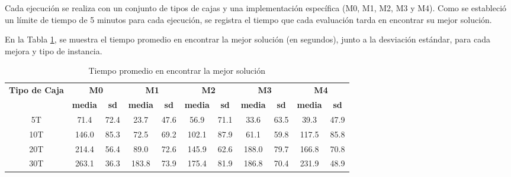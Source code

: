 Cada ejecución se realiza con un conjunto de tipos de cajas y una implementación específica (M0, M1, M2, M3 y M4). Como se estableció un límite de tiempo de 5 minutos para cada ejecución, se registra el tiempo que cada evaluación tarda en encontrar su mejor solución.

En la Tabla \ref{tab:tiempo}, se muestra el tiempo promedio en encontrar la mejor solución (en segundos), junto a la desviación estándar, para cada mejora y tipo de instancia.

\begin{table}[H]
    \centering
    \caption{Tiempo promedio en encontrar la mejor solución}
    \label{tab:tiempo}
    \begin{tabular}{|c|c|c|c|c|c|c|c|c|c|c|}
        \hline
        \multirow{2}{*}{\textbf{Tipo de Caja}} & \multicolumn{2}{c|}{\textbf{M0}} & \multicolumn{2}{c|}{\textbf{M1}} & \multicolumn{2}{c|}{\textbf{M2}} & \multicolumn{2}{c|}{\textbf{M3}} & \multicolumn{2}{c|}{\textbf{M4}}                                                                             \\ \cline{2-11}
                                               & \textbf{media}                   & \textbf{sd}                      & \textbf{media}                   & \textbf{sd}                      & \textbf{media}                   & \textbf{sd} & \textbf{media} & \textbf{sd} & \textbf{media} & \textbf{sd} \\ \hline
        5T                                     & 71.4                             & 72.4                             & 23.7                             & 47.6                             & 56.9                             & 71.1        & 33.6           & 63.5        & 39.3           & 47.9        \\ \hline
        10T                                    & 146.0                            & 85.3                             & 72.5                             & 69.2                             & 102.1                            & 87.9        & 61.1           & 59.8        & 117.5          & 85.8        \\ \hline
        20T                                    & 214.4                            & 56.4                             & 89.0                             & 72.6                             & 145.9                            & 62.6        & 188.0          & 79.7        & 166.8          & 70.8        \\ \hline
        30T                                    & 263.1                            & 36.3                             & 183.8                            & 73.9                             & 175.4                            & 81.9        & 186.8          & 70.4        & 231.9          & 48.9        \\ \hline

\end{tabular}
\end{table}
